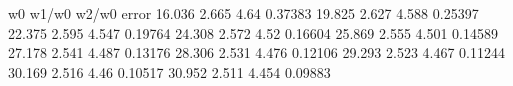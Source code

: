 \documentclass[a4paper,12pt,polish]{jupyterBook}
\begin{document}
\begin{sphinxVerbatimOutput}

\begin{sphinxVerbatim}[commandchars=\\\{\}]
   w0   w1/w0  w2/w0 error
\PYGZhy{}16.036 2.665 \PYGZhy{}4.64 0.37383
\PYGZhy{}19.825 2.627 \PYGZhy{}4.588 0.25397
\PYGZhy{}22.375 2.595 \PYGZhy{}4.547 0.19764
\PYGZhy{}24.308 2.572 \PYGZhy{}4.52 0.16604
\PYGZhy{}25.869 2.555 \PYGZhy{}4.501 0.14589
\PYGZhy{}27.178 2.541 \PYGZhy{}4.487 0.13176
\PYGZhy{}28.306 2.531 \PYGZhy{}4.476 0.12106
\PYGZhy{}29.293 2.523 \PYGZhy{}4.467 0.11244
\PYGZhy{}30.169 2.516 \PYGZhy{}4.46 0.10517
\PYGZhy{}30.952 2.511 \PYGZhy{}4.454 0.09883
\end{sphinxVerbatim}
\end{sphinxVerbatimOutput}
\end{document}

